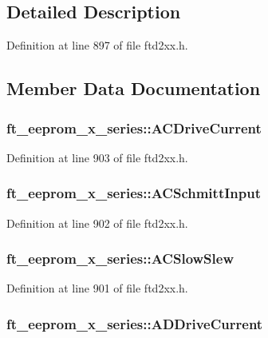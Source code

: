 \subsection{Detailed Description}


Definition at line 897 of file ftd2xx.h.

\subsection{Member Data Documentation}
\hypertarget{structft__eeprom__x__series_a62017256a98fdfbd1ec5a662725f9c84}{
\subsubsection[{ACDriveCurrent}]{ {\bf ft\_\-eeprom\_\-x\_\-series::ACDriveCurrent}}}
\label{structft__eeprom__x__series_a62017256a98fdfbd1ec5a662725f9c84}


Definition at line 903 of file ftd2xx.h.\hypertarget{structft__eeprom__x__series_af0941a8b6cbcfb69a84c9e9bd9751e4e}{
\subsubsection[{ACSchmittInput}]{ {\bf ft\_\-eeprom\_\-x\_\-series::ACSchmittInput}}}
\label{structft__eeprom__x__series_af0941a8b6cbcfb69a84c9e9bd9751e4e}


Definition at line 902 of file ftd2xx.h.\hypertarget{structft__eeprom__x__series_aa08fe7573f5f822e12a34973055c52e3}{
\subsubsection[{ACSlowSlew}]{ {\bf ft\_\-eeprom\_\-x\_\-series::ACSlowSlew}}}
\label{structft__eeprom__x__series_aa08fe7573f5f822e12a34973055c52e3}


Definition at line 901 of file ftd2xx.h.\hypertarget{structft__eeprom__x__series_a22a0cc77e2bf346e29d171194a91bc95}{
\subsubsection[{ADDriveCurrent}]{ {\bf ft\_\-eeprom\_\-x\_\-series::ADDriveCurrent}}}
\label{structft__eeprom__x__series_a22a0cc77e2bf346e29d171194a91bc95}


